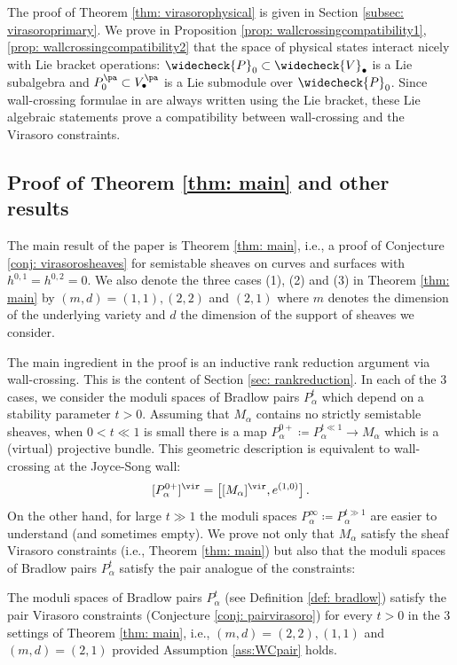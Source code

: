 The proof of Theorem \ref{thm: virasorophysical} is given in Section \ref{subsec: virasoroprimary}. We prove in Proposition \ref{prop: wallcrossingcompatibility1}, \ref{prop: wallcrossingcompatibility2} that the space of physical states interact nicely with Lie bracket operations: $\widecheck{P}_0\subset \widecheck{V}_\bullet
$ is a Lie subalgebra and $P_0^{\pa} \subset V_\bullet^{\pa}$ is a Lie submodule over $\widecheck{P}_0$. Since wall-crossing formulae in \cite{Jo21} are always written using the Lie bracket, these Lie algebraic statements prove a compatibility between wall-crossing and the Virasoro constraints.


\subsection{Proof of Theorem \ref{thm: main} and other results}
\label{sec: results}

The main result of the paper is Theorem \ref{thm: main}, i.e., a proof of Conjecture \ref{conj: virasorosheaves} for semistable sheaves on curves and surfaces with $h^{0,1}=h^{0,2}=0$. We also denote the three cases (1), (2)  and (3) in Theorem \ref{thm: main} by $(m,d) = (1,1), (2,2)$ and $(2,1)$ where $m$ denotes the dimension of the underlying variety and $d$ the dimension of the support of sheaves we consider.

The main ingredient in the proof is an inductive rank reduction argument via wall-crossing. This is the content of Section \ref{sec: rankreduction}. In each of the 3 cases, we consider the moduli spaces of Bradlow pairs $P^t_\alpha$ which depend on a stability parameter $t>0$. Assuming that $M_\alpha$ contains no strictly semistable sheaves, when $0<t\ll 1$ is small there is a map $P^{0+}_\alpha\coloneqq  P^{t\ll 1}_\alpha\to M_\alpha$ which is a (virtual) projective bundle. This geometric description is equivalent to wall-crossing at the Joyce-Song wall:
$$[P^{0+}_{\alpha}]^\vir = \big[[M_{\alpha}]^\vir,e^{(1,0)}\big]\,.$$
On the other hand, for large $t\gg 1$ the moduli spaces $P^{\infty}_\alpha\coloneqq  P^{t\gg 1}_\alpha$ are easier to understand (and sometimes empty). We prove not only that $M_\alpha$ satisfy the sheaf Virasoro constraints (i.e., Theorem  \ref{thm: main}) but also that the moduli spaces of Bradlow pairs $P_\alpha^t$ satisfy the pair analogue of the constraints:
\begin{theorem}
\notready\label{thm: virasorobradlowpairs}
The moduli spaces of Bradlow pairs $P_\alpha^t$ (see Definition \ref{def: bradlow}) satisfy the pair Virasoro constraints (Conjecture \ref{conj: pairvirasoro}) for every $t>0$ in the 3 settings of Theorem \ref{thm: main}, i.e., $(m,d)=(2,2), (1,1)$ and $(m,d)=(2,1)$ provided Assumption \ref{ass:WCpair} holds.
\end{theorem}

